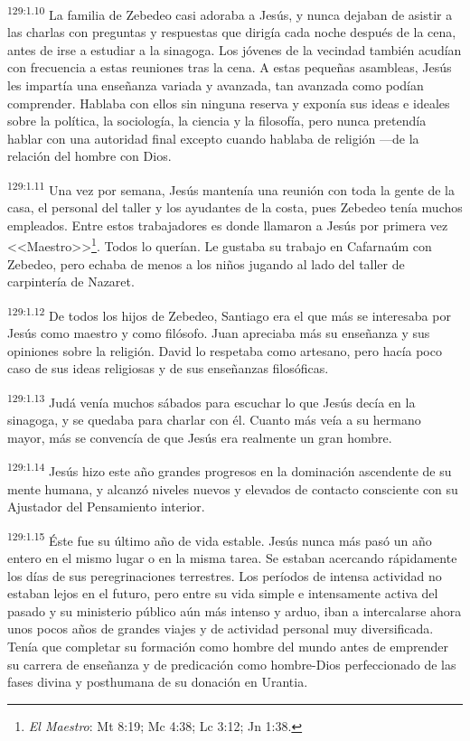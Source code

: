 \par 
\textsuperscript{129:1.10} La familia de Zebedeo casi adoraba a Jesús, y nunca dejaban de asistir a las charlas con preguntas y respuestas que dirigía cada noche después de la cena, antes de irse a estudiar a la sinagoga. Los jóvenes de la vecindad también acudían con frecuencia a estas reuniones tras la cena. A estas pequeñas asambleas, Jesús les impartía una enseñanza variada y avanzada, tan avanzada como podían comprender. Hablaba con ellos sin ninguna reserva y exponía sus ideas e ideales sobre la política, la sociología, la ciencia y la filosofía, pero nunca pretendía hablar con una autoridad final excepto cuando hablaba de religión ---de la relación del hombre con Dios.

\par 
\textsuperscript{129:1.11} Una vez por semana, Jesús mantenía una reunión con toda la gente de la casa, el personal del taller y los ayudantes de la costa, pues Zebedeo tenía muchos empleados. Entre estos trabajadores es donde llamaron a Jesús por primera vez <<Maestro>>\footnote{\textit{El Maestro}: Mt 8:19; Mc 4:38; Lc 3:12; Jn 1:38.}. Todos lo querían. Le gustaba su trabajo en Cafarnaúm con Zebedeo, pero echaba de menos a los niños jugando al lado del taller de carpintería de Nazaret.

\par 
\textsuperscript{129:1.12} De todos los hijos de Zebedeo, Santiago era el que más se interesaba por Jesús como maestro y como filósofo. Juan apreciaba más su enseñanza y sus opiniones sobre la religión. David lo respetaba como artesano, pero hacía poco caso de sus ideas religiosas y de sus enseñanzas filosóficas.

\par 
\textsuperscript{129:1.13} Judá venía muchos sábados para escuchar lo que Jesús decía en la sinagoga, y se quedaba para charlar con él. Cuanto más veía a su hermano mayor, más se convencía de que Jesús era realmente un gran hombre.

\par 
\textsuperscript{129:1.14} Jesús hizo este año grandes progresos en la dominación ascendente de su mente humana, y alcanzó niveles nuevos y elevados de contacto consciente con su Ajustador del Pensamiento interior.

\par 
\textsuperscript{129:1.15} Éste fue su último año de vida estable. Jesús nunca más pasó un año entero en el mismo lugar o en la misma tarea. Se estaban acercando rápidamente los días de sus peregrinaciones terrestres. Los períodos de intensa actividad no estaban lejos en el futuro, pero entre su vida simple e intensamente activa del pasado y su ministerio público aún más intenso y arduo, iban a intercalarse ahora unos pocos años de grandes viajes y de actividad personal muy diversificada. Tenía que completar su formación como hombre del mundo antes de emprender su carrera de enseñanza y de predicación como hombre-Dios perfeccionado de las fases divina y posthumana de su donación en Urantia.


